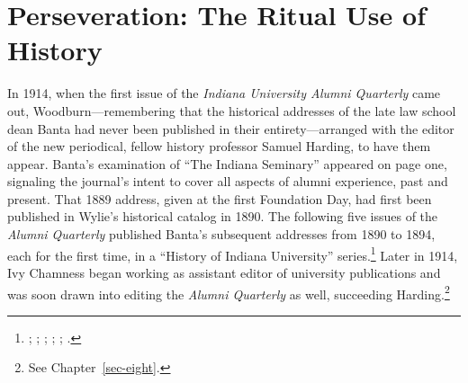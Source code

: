 \documentclass[
  american,
  letterpaper,
]{scrreprt}
\begin{document}
\section{Perseveration: The Ritual Use of
History}\label{perseveration-the-ritual-use-of-history}

In 1914, when the first issue of the \emph{Indiana University Alumni
Quarterly} came out, Woodburn---remembering that the historical
addresses of the late law school dean Banta had never been published in
their entirety---arranged with the editor of the new periodical, fellow
history professor Samuel Harding, to have them appear. Banta's
examination of ``The Indiana Seminary'' appeared on page one, signaling
the journal's intent to cover all aspects of alumni experience, past and
present. That 1889 address, given at the first Foundation Day, had first
been published in Wylie's historical catalog in 1890. The following five
issues of the \emph{Alumni Quarterly} published Banta's subsequent
addresses from 1890 to 1894, each for the first time, in a ``History of
Indiana University'' series.\footnote{;
  ; ; ;
  ; .} Later in 1914, Ivy Chamness began working as
assistant editor of university publications and was soon drawn into
editing the \emph{Alumni Quarterly} as well, succeeding
Harding.\footnote{See Chapter~\ref{sec-eight}.}
\end{document}
